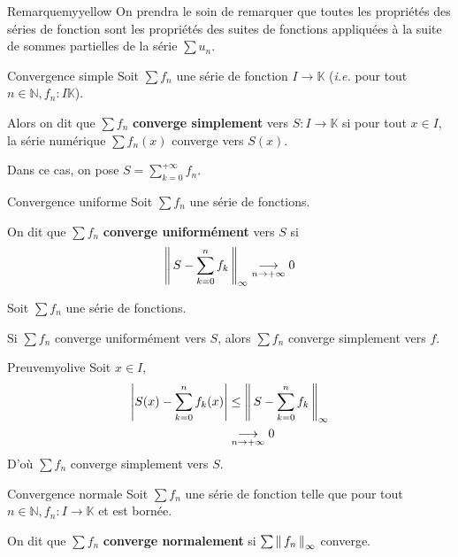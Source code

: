     \begin{omed}{Remarque}{myyellow}
        On prendra le soin de remarquer que toutes les propriétés des séries de fonction sont les propriétés des suites de fonctions appliquées à la suite de sommes partielles de la série $\sum u_n$.
    \end{omed}

    \begin{defi}{Convergence simple}{}
        Soit $\sum f_n$ une série de fonction $I \rightarrow \mathbb{K}$ (\textit{i.e.} pour tout $n \in \mathbb{N}, f_n : I \mathbb{K}$).

        Alors on dit que $\sum f_n$ \textbf{converge simplement} vers $S : I \rightarrow \mathbb{K}$ si pour tout $x \in I$, la série numérique $\sum f_n(x)$ converge vers $S(x)$.

        Dans ce cas, on pose $S = \sum_{k=0}^{+\infty} f_n$.
    \end{defi}

    \begin{defi}{Convergence uniforme}{}
        Soit $\sum f_n$ une série de fonctions. 

        On dit que $\sum f_n$ \textbf{converge uniformément} vers $S$ si 
        \[ \left\lVert\,S - \sum_{k=0}^{n} f_k\,\right\rVert_{\infty} \underset{n \rightarrow +\infty}{\longrightarrow} 0 \] 
    \end{defi}

    \begin{prop}{}{}
        Soit $\sum f_n$ une série de fonctions. 

        Si $\sum f_n$ converge uniformément vers $S$, alors $\sum f_n$ converge simplement vers $f$.
    \end{prop}

    \begin{demo}{Preuve}{myolive}
        Soit $x \in I$, 
        \begin{align*}
            \left\lvert S(x) - \sum_{k=0}^{n}f_k(x)\right\rvert 
            &\leq \left\lVert\,S - \sum_{k=0}^{n} f_k\,\right\rVert_{\infty} \\
            & \underset{n \rightarrow +\infty}{\longrightarrow} 0 
        \end{align*}
        D’où $\sum f_n$ converge simplement vers $S$.
    \end{demo}

    \begin{defi}{Convergence normale}{}
        Soit $\sum f_n$ une série de fonction telle que pour tout $n \in \mathbb{N}, f_n : I \rightarrow \mathbb{K}$ et est bornée.

        On dit que $\sum f_n$ \textbf{converge normalement} si $\sum \left\lVert\,f_n\,\right\rVert_{\infty}$ converge.
    \end{defi}

